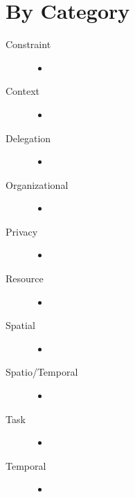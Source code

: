 \documentclass[letterpaper,10pt,english]{sphinxmanual}
\begin{document}
\section{By Category}
\label{research_questions/RQ_7:by-category}\begin{description}
\item[{Constraint}] \leavevmode\begin{itemize}
\item {} 
\end{itemize}

\item[{Context}] \leavevmode\begin{itemize}
\item {} 
\end{itemize}

\item[{Delegation}] \leavevmode\begin{itemize}
\item {} 
\end{itemize}

\item[{Organizational}] \leavevmode\begin{itemize}
\item {} 
\end{itemize}

\item[{Privacy}] \leavevmode\begin{itemize}
\item {} 
\end{itemize}

\item[{Resource}] \leavevmode\begin{itemize}
\item {} 
\end{itemize}

\item[{Spatial}] \leavevmode\begin{itemize}
\item {} 
\end{itemize}

\item[{Spatio/Temporal}] \leavevmode\begin{itemize}
\item {} 
\end{itemize}

\item[{Task}] \leavevmode\begin{itemize}
\item {} 
\end{itemize}

\item[{Temporal}] \leavevmode\begin{itemize}
\item {} 
\end{itemize}

\end{description}
\end{document}
